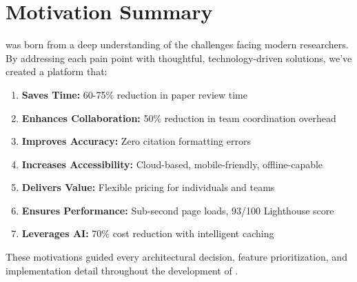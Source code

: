 \section{Motivation Summary}
\label{sec:motivation-summary}

\projectname{} was born from a deep understanding of the challenges facing modern researchers. By addressing each pain point with thoughtful, technology-driven solutions, we've created a platform that:

\begin{enumerate}[leftmargin=*]
    \item \textbf{Saves Time:} 60-75\% reduction in paper review time
    \item \textbf{Enhances Collaboration:} 50\% reduction in team coordination overhead
    \item \textbf{Improves Accuracy:} Zero citation formatting errors
    \item \textbf{Increases Accessibility:} Cloud-based, mobile-friendly, offline-capable
    \item \textbf{Delivers Value:} Flexible pricing for individuals and teams
    \item \textbf{Ensures Performance:} Sub-second page loads, 93/100 Lighthouse score
    \item \textbf{Leverages AI:} 70\% cost reduction with intelligent caching
\end{enumerate}

\vspace{0.5cm}
\noindent
These motivations guided every architectural decision, feature prioritization, and implementation detail throughout the development of \projectname{}.
